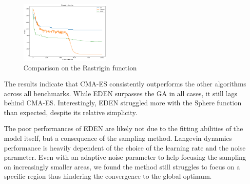 \begin{figure}
    \centering
    \includegraphics[width=0.4\textwidth]{img/rastrigin.png}
    \caption{Comparison on the Rastrigin function}
    \label{fig:rastrigin}
\end{figure}

The results indicate that CMA-ES consistently outperforms the other algorithms across all benchmarks. While EDEN surpasses the GA in all cases, it still lags behind CMA-ES. Interestingly, EDEN struggled more with the Sphere function than expected, despite its relative simplicity.

The poor performances of EDEN are likely not due to the fitting abilities of the model itself, but a consequence of the sampling method. Langevin dynamics performance is heavily dependent of the choice of the learning rate and the noise parameter. Even with an adaptive noise parameter to help focusing the sampling on increasingly smaller areas, we found the method still struggles to focus on a specific region thus hindering the convergence to the global optimum.


